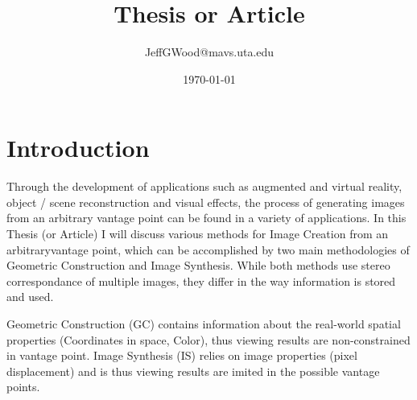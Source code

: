 \documentclass{report}
\title{Thesis or Article}
\author{JeffGWood@mavs.uta.edu}
\date{\today}
\begin{document}
\Huge
\maketitle
\large
\newpage
\tableofcontents
\newpage


\chapter{Introduction}
\par Through the development of applications such as augmented and virtual reality, object / scene reconstruction and visual effects, the process of generating images from an arbitrary vantage point can be found in a variety of applications. In this Thesis (or Article) I will discuss various methods for Image Creation from an arbitraryvantage point, which can be accomplished by two main methodologies of Geometric Construction and Image Synthesis. While both methods use stereo correspondance of multiple images, they differ in the way information is stored and used.
\par Geometric Construction (GC) contains information about the real-world spatial properties (Coordinates in space, Color), thus viewing results are non-constrained in vantage point. Image Synthesis (IS) relies on image properties (pixel displacement) and is thus viewing results are imited in the possible vantage points.
\newpage
\end{document}
